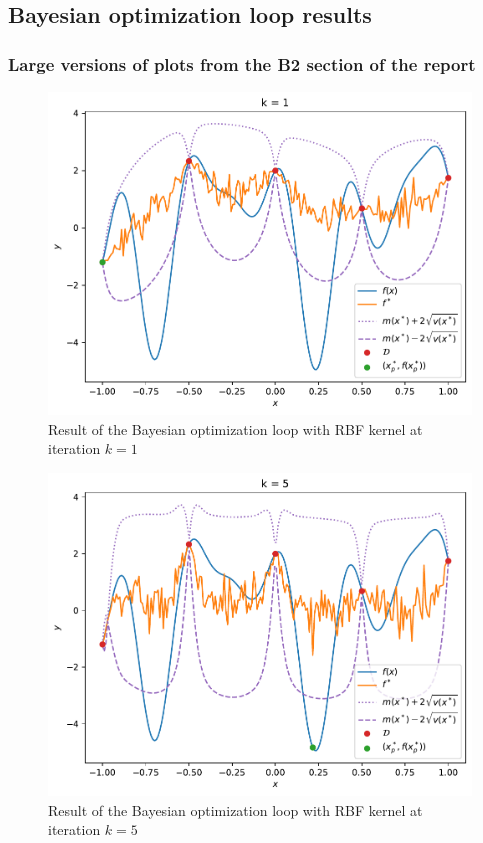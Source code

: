 \subsection{Bayesian optimization loop results}
\subsubsection{Large versions of plots from the B2 section of the report}
\begin{figure}[H]
    \includegraphics[width=\textwidth]{figures/gp/b2-k_1.pdf}
    \caption{Result of the Bayesian optimization loop with RBF kernel at iteration $k = 1$}
\end{figure}
\begin{figure}[H]
    \includegraphics[width=\textwidth]{figures/gp/b2-k_5.pdf}
    \caption{Result of the Bayesian optimization loop with RBF kernel at iteration $k = 5$}
\end{figure}
